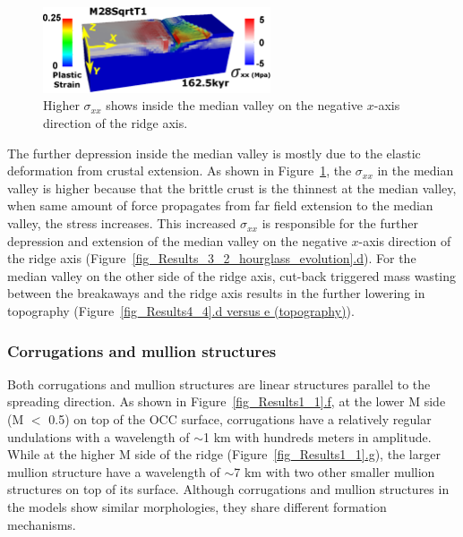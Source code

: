 \begin{figure}[h]
  \centering
    \includegraphics[width=0.6\textwidth]{./Figures/fig_Results4_7_sqrt_cut_back_conjugate_Sxx.eps}
  \caption{Higher $\sigma_{xx}$ shows inside the median valley on the negative $x$-axis direction of the ridge axis. }
 \label{fig_Results4_7}
\end{figure}

The further depression inside the median valley is mostly due to the elastic deformation from crustal extension. As shown in Figure~\hyperref[fig_Results4_7]{\ref{fig_Results4_7}}, the $\sigma_{xx}$ in the median valley is higher because that the brittle crust is the thinnest at the median valley, when same amount of force propagates from far field extension to the median valley, the stress increases. This increased $\sigma_{xx}$ is responsible for the further depression and extension of the median valley on the negative $x$-axis direction of the ridge axis (Figure~\hyperref[fig_Results_3_2_hourglass_evolution]{\ref{fig_Results_3_2_hourglass_evolution}.d}). For the median valley on the other side of the ridge axis, cut-back triggered mass wasting between the breakaways and the ridge axis results in the further lowering in topography (Figure~\hyperref[fig_Results4_4]{\ref{fig_Results4_4}.d versus e (topography)}). 

\subsubsection{Corrugations and mullion structures}

Both corrugations and mullion structures are linear structures parallel to the spreading direction. As shown in Figure~\hyperref[fig_Results1_1]{\ref{fig_Results1_1}.f}, at the lower M side (M $<$ 0.5) on top of the OCC surface, corrugations have a relatively regular undulations with a wavelength of $\sim$1 km with hundreds meters in amplitude. While at the higher M side of the ridge (Figure~\hyperref[fig_Results1_1]{\ref{fig_Results1_1}.g}), the larger mullion structure have a wavelength of $\sim$7 km with two other smaller mullion structures on top of its surface. Although corrugations and mullion structures in the models show similar morphologies, they share different formation mechanisms.      

